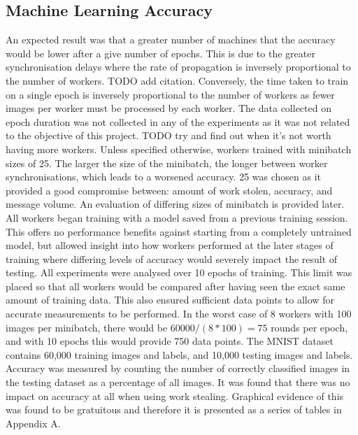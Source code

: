 \documentclass[12pt]{article}
\begin{document}
\subsection{Machine Learning Accuracy}
An expected result was that a greater number of machines that the accuracy would be lower after a give number of epochs. This is due to the greater synchronisation delays where the rate of propagation is inversely proportional to the number of workers. TODO add citation. Conversely, the time taken to train on a single epoch is inversely proportional to the number of workers as fewer images per worker must be processed by each worker. The data collected on epoch duration was not collected in any of the experiments as it was not related to the objective of this project. TODO try and find out when it's not worth having more workers.
\newline
\newline
Unless specified otherwise, workers trained with minibatch sizes of 25. The larger the size of the minibatch, the longer between worker synchronisations, which leads to a worsened accuracy. 25 was chosen as it provided a good compromise between: amount of work stolen, accuracy, and message volume. An evaluation of differing sizes of minibatch is provided later.
\newline
\newline
All workers began training with a model saved from a previous training session. This offers no performance benefits against starting from a completely untrained model, but allowed insight into how workers performed at the later stages of training where differing levels of accuracy would severely impact the result of testing.
\newline
\newline
All experiments were analysed over 10 epochs of training. This limit was placed so that all workers would be compared after having seen the exact same amount of training data. This also ensured sufficient data points to allow for accurate measurements to be performed. In the worst case of 8 workers with 100 images per minibatch, there would be $60000/(8*100) = 75$ rounds per epoch, and with 10 epochs this would provide 750 data points.
\newline
\newline
The MNIST dataset contains 60,000 training images and labels, and 10,000 testing images and labels. Accuracy was measured by counting the number of correctly classified images in the testing dataset as a percentage of all images.
\newline
\newline
It was found that there was no impact on accuracy at all when using work stealing. Graphical evidence of this was found to be gratuitous and therefore it is presented as a series of tables in Appendix A. 
\end{document}
